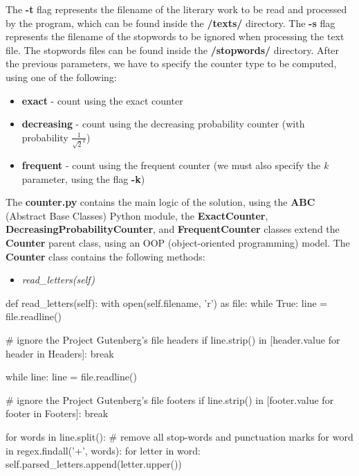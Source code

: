 \documentclass[...]{revdetua}
\begin{document}
The \textbf{-t} flag represents the filename of the literary work to be read and processed by the program, which can be found inside the \textbf{/texts/} directory. The \textbf{-s} flag represents the filename of the stopwords to be ignored when processing the text file. The stopwords files can be found inside the \textbf{/stopwords/} directory. After the previous parameters, we have to specify the counter type to be computed, using one of the following:
\begin{itemize}
    \item \textbf{exact} - count using the exact counter
    \item \textbf{decreasing} - count using the decreasing probability counter (with probability \(\frac{1}{\sqrt{2}^k}\))
    \item \textbf{frequent} - count using the frequent counter (we must also specify the \textit{k} parameter, using the flag \textbf{-k})
\end{itemize}

The \textbf{counter.py} contains the main logic of the solution, using the \textbf{ABC}\cite{abstract_base_classes} (Abstract Base Classes) Python module, the \textbf{ExactCounter}, \textbf{DecreasingProbabilityCounter}, and \textbf{FrequentCounter} classes extend the \textbf{Counter} parent class, using an OOP (object-oriented programming) model.
The \textbf{Counter} class contains the following methods:
\begin{itemize}
    \item \textit{read\_letters(self)}
\end{itemize}

\begin{python}
def read_letters(self):
        with open(self.filename, 'r') as file:
            while True:
                line = file.readline()

                # ignore the Project Gutenberg's file headers
                if line.strip() in [header.value for header in Headers]: break
                
            while line:
                line = file.readline()

                # ignore the Project Gutenberg's file footers
                if line.strip() in [footer.value for footer in Footers]: break

                for words in line.split():
                    # remove all stop-words and punctuation marks
                    for word in regex.findall('+', words):
                        for letter in word:
                            self.parsed_letters.append(letter.upper())
\end{python}
\end{document}
